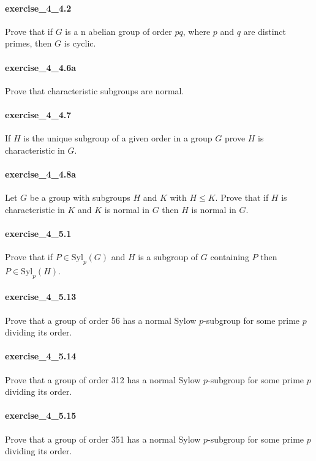 \documentclass{article}
\begin{document}
\paragraph{exercise\_4\_4.2} Prove that if $G$ is a n abelian group of order $p q$, where $p$ and $q$ are distinct primes, then $G$ is cyclic.

\paragraph{exercise\_4\_4.6a} Prove that characteristic subgroups are normal.

\paragraph{exercise\_4\_4.7} If $H$ is the unique subgroup of a given order in a group $G$ prove $H$ is characteristic in $G$.

\paragraph{exercise\_4\_4.8a} Let $G$ be a group with subgroups $H$ and $K$ with $H \leq K$. Prove that if $H$ is characteristic in $K$ and $K$ is normal in $G$ then $H$ is normal in $G$.

\paragraph{exercise\_4\_5.1} Prove that if $P \in \mathrm{Syl}_{p}(G)$ and $H$ is a subgroup of $G$ containing $P$ then $P \in\mathrm{Syl}_{p}(H)$.

\paragraph{exercise\_4\_5.13} Prove that a group of order 56 has a normal Sylow $p$-subgroup for some prime $p$ dividing its order.

\paragraph{exercise\_4\_5.14} Prove that a group of order 312 has a normal Sylow $p$-subgroup for some prime $p$ dividing its order.

\paragraph{exercise\_4\_5.15} Prove that a group of order 351 has a normal Sylow $p$-subgroup for some prime $p$ dividing its order.
\end{document}
